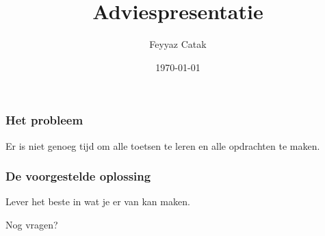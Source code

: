 \documentclass{beamer}
\title{Adviespresentatie}
\subtitle{}
\author{Feyyaz Catak}
\institute{Hogeschool Rotterdam}
\date{\today}
\begin{document}
\begin{frame}
	\titlepage
\end{frame}
\begin{frame}
\frametitle{Het probleem}
\small{Er is niet genoeg tijd om alle toetsen te leren en alle opdrachten te maken.}
\end{frame}
\begin{frame}
\frametitle{De voorgestelde oplossing}
\small{Lever het beste in wat je er van kan maken.}
\end{frame}
\begin{frame}
\Huge{Nog vragen?}
\end{frame}
\end{document}
